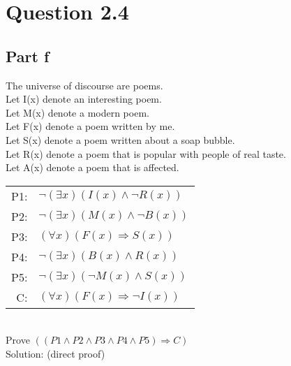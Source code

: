 \documentclass{article}
\begin{document}
	\section{Question 2.4}
		\subsection{Part f}
		The universe of discourse are poems. \\
			Let I(x) denote an interesting poem. \\
			Let M(x) denote a modern poem. \\
			Let F(x) denote a poem written by me. \\
			Let S(x) denote a poem written about a soap bubble. \\
			Let R(x) denote a poem that is popular with people of real taste. \\
			Let A(x) denote a poem that is affected. \\
			\newline
			\begin{tabular}{r l}
				P1: & $\lnot(\exists x)(I(x) \land \lnot R(x))$ \\
				P2: & $\lnot(\exists x)(M(x) \land \lnot B(x))$ \\
				P3: & $(\forall x)(F(x) \Rightarrow S(x))$ \\
				P4: & $\lnot(\exists x)(B(x) \land R(x))$ \\
				P5: & $\lnot(\exists x)(\lnot M(x) \land S(x))$ \\ \hline
				C: & $(\forall x)(F(x) \Rightarrow \lnot I(x))$ \\
			\end{tabular}
			\newline \\
			Prove $((P1 \land P2 \land P3 \land P4 \land P5) \Rightarrow C)$ \\
			Solution: (direct proof)
\end{document}
